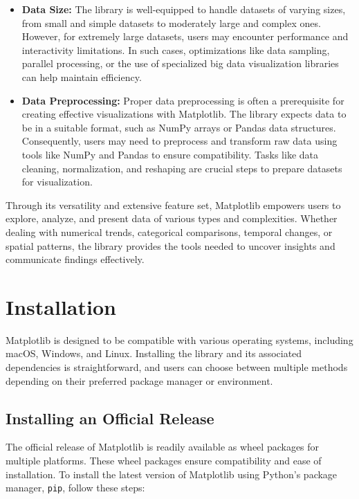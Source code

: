\begin{itemize}
	\item \textbf{Data Size:} The library is well-equipped to handle datasets of varying sizes, from small and simple datasets to moderately large and complex ones. However, for extremely large datasets, users may encounter performance and interactivity limitations. In such cases, optimizations like data sampling, parallel processing, or the use of specialized big data visualization libraries can help maintain efficiency.
	
	\item \textbf{Data Preprocessing:} Proper data preprocessing is often a prerequisite for creating effective visualizations with Matplotlib. The library expects data to be in a suitable format, such as NumPy arrays or Pandas data structures. Consequently, users may need to preprocess and transform raw data using tools like NumPy and Pandas to ensure compatibility. Tasks like data cleaning, normalization, and reshaping are crucial steps to prepare datasets for visualization.
	
\end{itemize}

Through its versatility and extensive feature set, Matplotlib empowers users to explore, analyze, and present data of various types and complexities. Whether dealing with numerical trends, categorical comparisons, temporal changes, or spatial patterns, the library provides the tools needed to uncover insights and communicate findings effectively.


\section{Installation}

Matplotlib is designed to be compatible with various operating systems, including macOS, Windows, and Linux. Installing the library and its associated dependencies is straightforward, and users can choose between multiple methods depending on their preferred package manager or environment.

\subsection{Installing an Official Release}

The official release of Matplotlib is readily available as wheel packages for multiple platforms. These wheel packages ensure compatibility and ease of installation. To install the latest version of Matplotlib using Python’s package manager, \texttt{pip}, follow these steps:

